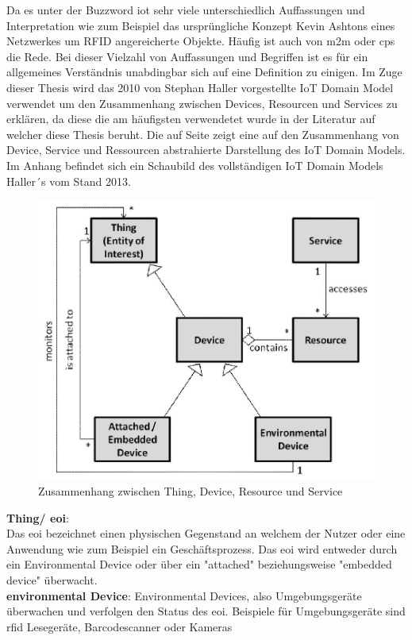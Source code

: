 \documentclass[a4paper, 12pt, twoside, headsepline=true]{scrartcl} %
\begin{document}
Da es unter der Buzzword \ac{iot} sehr viele unterschiedlich Auffassungen und Interpretation wie zum Beispiel das ursprüngliche Konzept Kevin Ashtons eines Netzwerkes um RFID angereicherte Objekte. Häufig ist auch von \ac{m2m} oder \ac{cps} die Rede. Bei dieser Vielzahl von Auffassungen und Begriffen ist es für ein allgemeines Verständnis unabdingbar sich auf eine Definition zu einigen. Im Zuge dieser Thesis wird das 2010 von Stephan Haller vorgestellte IoT Domain Model verwendet um den Zusammenhang zwischen Devices, Resourcen und Services zu erklären\cite{haller2010things}, da diese die am häufigsten verwendetet wurde in der Literatur auf welcher diese Thesis beruht. Die auf Seite \pageref{fig:domainmodel} zeigt eine auf den Zusammenhang von Device, Service und Ressourcen abstrahierte Darstellung des IoT Domain Models. Im Anhang befindet sich ein Schaubild des vollständigen IoT Domain Models Haller´s vom Stand 2013.

\begin{figure}[H]
	\includegraphics[height=8 cm,keepaspectratio,center]{figures/domainmodel}
	\vspace{0.5cm}
	\caption{Zusammenhang zwischen Thing, Device, Resource und Service \cite{haller2010things}}
	\label{domainmodel}
\end{figure}

\textbf{Thing/ \ac{eoi}}: \\ 
Das \ac{eoi} bezeichnet einen physischen Gegenstand an welchem der Nutzer oder eine Anwendung wie zum Beispiel ein Geschäftsprozess. Das \ac{eoi} wird entweder durch ein Environmental Device oder über ein "attached" beziehungsweise "embedded device" überwacht.
\\

\textbf{environmental Device}: 
Environmental Devices, also Umgebungsgeräte überwachen und verfolgen den Status des \ac{eoi}. Beispiele für Umgebungsgeräte sind \ac{rfid} Lesegeräte, Barcodescanner oder Kameras
\end{document}
